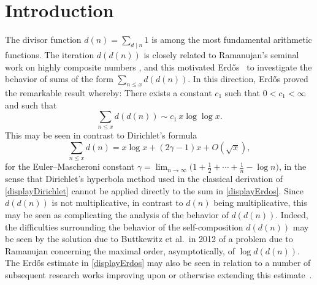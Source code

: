 \documentclass[12pt]{article}
\begin{document}
\vspace{0.1in}


\section{Introduction}
 The divisor function $d(n) = \sum_{d \mid n} 1 $ is among the most fundamental arithmetic functions. 
 The iteration 
 $d(d(n))$ 
 is closely related to Ramanujan's seminal work on highly composite numbers \cite{Ramanujan1915comp}, and this motivated 
 Erd\H{o}s~\cite{Erdos1968} to investigate the behavior of sums of the form $ \sum_{n \leq x} d(d(n))$. 
 In this direction, Erd\H os proved 
 the remarkable result whereby: There exists a constant $c_1$ such that $ 0 < c_1 < \infty$ and such that 
\begin{equation}\label{displayErdos}
 \sum_{n \leq x} d(d(n)) \sim c_1 \, x \log \log x. 
\end{equation}
 This may be seen in contrast to Dirichlet's formula 
\begin{equation}\label{displayDirichlet}
 \sum_{n\leq x} d(n) = x \log x + (2 \gamma -1) x + O(\sqrt{x}), 
\end{equation}
 for the Euler--Mascheroni constant $\gamma = \lim_{n \to \infty} \big( 1 + \frac{1}{2} 
 + \cdots + \frac{1}{n} - \log n \big)$, in the sense that Dirichlet’s hyperbola method 
 used in the classical derivation of \eqref{displayDirichlet} cannot be applied directly to the sum in \eqref{displayErdos}. 
 Since $d(d(n))$ is not multiplicative, in contrast to $d(n)$ being multiplicative, this may be seen 
 as complicating the analysis of the behavior of $d(d(n))$. 
 Indeed, the difficulties surrounding the behavior of the self-composition $d(d(n))$ may be seen by 
 the solution due to Buttkewitz et al.\ in 2012 \cite{ButtkewitzElsholtzFordSchlagePuchta2012} of a problem due to Ramanujan 
 \cite{Ramanujan1915comp} concerning the maximal order, asymptotically, of $\log d(d(n))$. The Erd\H os estimate in 
 \eqref{displayErdos} may also be seen in relation to a number of subsequent research works improving upon or otherwise extending 
 this estimate~\cite{ErdosKatai1969,Heppner1974,Katai1969,Rieger1972}. 
\end{document}
